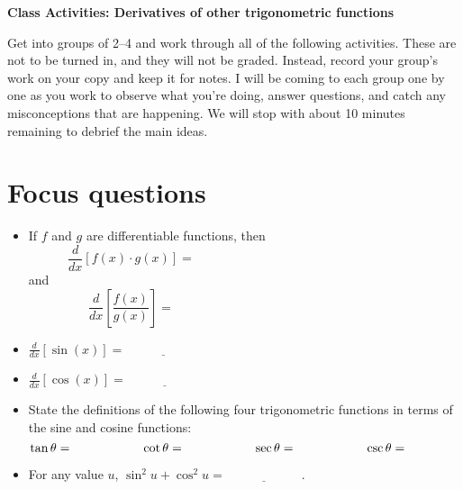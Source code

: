 \documentclass[11pt]{article}
\begin{document}
	
	\thispagestyle{empty}
	\renewcommand{\headrulewidth}{0.0pt}
	\thispagestyle{fancy}
	\lfoot{}
	\cfoot{}
	\rfoot{}	
	
	\vspace*{0in}

		\begin{center}
			\begin{large}
			\textbf{Class Activities: Derivatives of other trigonometric functions} \\
			\end{large}
		\end{center}
	
Get into groups of 2--4 and work through all of the following activities. These are not to be turned in, and they will not be graded. Instead, record your group's work on your copy and keep it for notes. I will be coming to each group one by one as you work to observe what you're doing, answer questions, and catch any misconceptions that are happening. We will stop with about 10 minutes remaining to debrief the main ideas. \\

\section{Focus questions}

\begin{itemize}
	\item If $f$ and $g$ are differentiable functions, then 
	\[ \frac{d}{dx}\left[ f(x) \cdot g(x) \right] = \hspace{3in} \]
	and 
	\[ \frac{d}{dx}\left[ \frac{f(x)}{g(x)} \right] = \hspace{3in} \]
	\item $\frac{d}{dx}[\sin(x)] = \underline{\hspace{1in}}$
	\item $\frac{d}{dx}[\cos(x)] = \underline{\hspace{1in}}$
	\item State the definitions of the following four trigonometric functions in terms of the sine and cosine functions: 
	\[ \tan \theta = \hspace{0.5in} \qquad  \cot \theta = \hspace{0.5in} \qquad  \sec \theta = \hspace{0.5in} \qquad  \csc \theta = \hspace{0.5in} \qquad \]
	\item For any value $u$, $\sin^2 u + \cos^2 u = \underline{\hspace{1in}}$. 
\end{itemize}	
	
\end{document}
